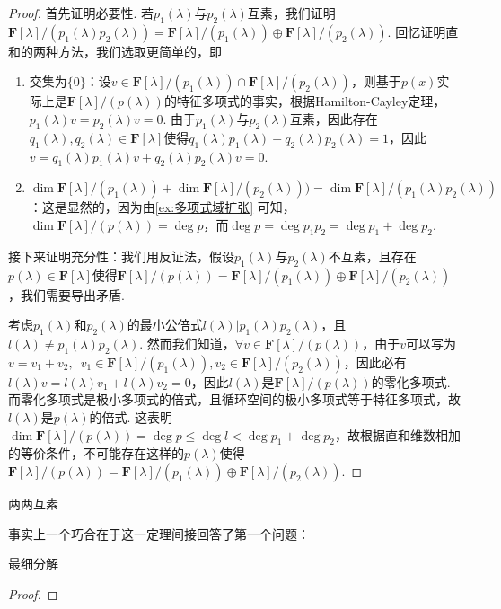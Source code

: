 \begin{proof}
    首先证明必要性. 若$p_1(\lambda)$与$p_2(\lambda)$互素，我们证明$\mathbf{F}[\lambda]/(p_1(\lambda)p_2(\lambda))=\mathbf{F}[\lambda]/(p_1(\lambda))\oplus\mathbf{F}[\lambda]/(p_2(\lambda))$. 回忆证明直和的两种方法，我们选取更简单的，即
    \begin{enumerate}
        \item 交集为$\{0\}$：设$v\in\mathbf{F}[\lambda]/(p_1(\lambda))\cap\mathbf{F}[\lambda]/(p_2(\lambda))$，则基于$p(x)$实际上是$\mathbf{F}[\lambda]/(p(\lambda))$的特征多项式的事实，根据Hamilton-Cayley定理，$p_1(\lambda)v=p_2(\lambda)v=0$. 由于$p_1(\lambda)$与$p_2(\lambda)$互素，因此存在$q_1(\lambda),q_2(\lambda)\in\mathbf{F}[\lambda]$使得$q_1(\lambda)p_1(\lambda)+q_2(\lambda)p_2(\lambda)=1$，因此$v=q_1(\lambda)p_1(\lambda)v+q_2(\lambda)p_2(\lambda)v=0$.
        \item $\dim\mathbf{F}[\lambda]/(p_1(\lambda))+\dim\mathbf{F}[\lambda]/(p_2(\lambda)))=\dim\mathbf{F}[\lambda]/(p_1(\lambda)p_2(\lambda))$：这是显然的，因为由\autoref{ex:多项式域扩张} 可知，$\dim\mathbf{F}[\lambda]/(p(\lambda))=\deg p$，而$\deg p=\deg p_1p_2=\deg p_1+\deg p_2$.
    \end{enumerate}
    接下来证明充分性：我们用反证法，假设$p_1(\lambda)$与$p_2(\lambda)$不互素，且存在$p(\lambda)\in\mathbf{F}[\lambda]$使得$\mathbf{F}[\lambda]/(p(\lambda))=\mathbf{F}[\lambda]/(p_1(\lambda))\oplus\mathbf{F}[\lambda]/(p_2(\lambda))$，我们需要导出矛盾.

    考虑$p_1(\lambda)$和$p_2(\lambda)$的最小公倍式$l(\lambda)|p_1(\lambda)p_2(\lambda)$，且$l(\lambda)\neq p_1(\lambda)p_2(\lambda)$. 然而我们知道，$\forall v\in\mathbf{F}[\lambda]/(p(\lambda))$，由于$v$可以写为$v=v_1+v_2,\enspace v_1\in\mathbf{F}[\lambda]/(p_1(\lambda)),v_2\in\mathbf{F}[\lambda]/(p_2(\lambda))$，因此必有$l(\lambda)v=l(\lambda)v_1+l(\lambda)v_2=0$，因此$l(\lambda)$是$\mathbf{F}[\lambda]/(p(\lambda))$的零化多项式. 而零化多项式是极小多项式的倍式，且循环空间的极小多项式等于特征多项式，故$l(\lambda)$是$p(\lambda)$的倍式. 这表明$\dim\mathbf{F}[\lambda]/(p(\lambda))=\deg p\leqslant \deg l<\deg p_1+\deg p_2$，故根据直和维数相加的等价条件，不可能存在这样的$p(\lambda)$使得$\mathbf{F}[\lambda]/(p(\lambda))=\mathbf{F}[\lambda]/(p_1(\lambda))\oplus\mathbf{F}[\lambda]/(p_2(\lambda))$.
\end{proof}

\begin{corollary}{}{}
    两两互素
\end{corollary}

事实上一个巧合在于这一定理间接回答了第一个问题：
\begin{corollary}{}{}
    最细分解
\end{corollary}
\begin{proof}

\end{proof}

